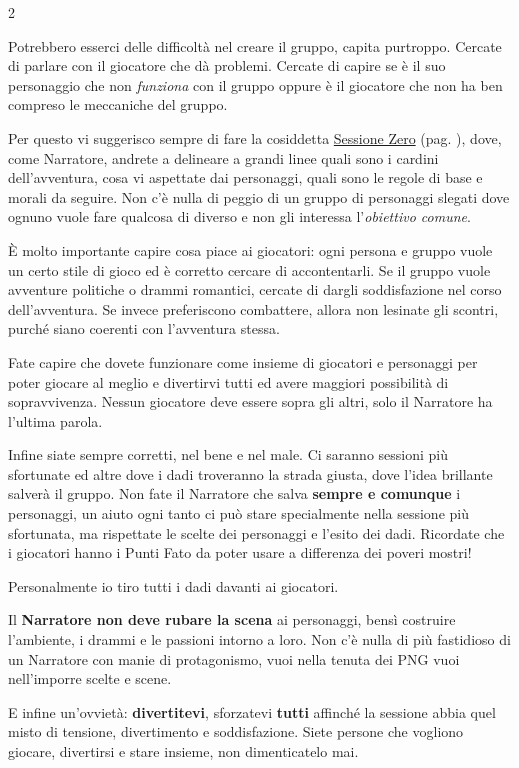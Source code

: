 \begin{multicols}{2}
{Potrebbero esserci delle difficoltà nel creare il gruppo, capita purtroppo. Cercate di parlare con il giocatore che dà problemi. Cercate di capire se è il suo personaggio che non \emph{funziona} con il gruppo oppure è il giocatore che non ha ben compreso le meccaniche del gruppo.

Per questo vi suggerisco sempre di fare la cosiddetta \hyperlink{sessionezero}{Sessione Zero} (pag. \pageref{sessionezero}), dove, come Narratore, andrete a delineare a grandi linee quali sono i cardini dell'avventura, cosa vi aspettate dai personaggi, quali sono le regole di base e morali da seguire. Non c'è nulla di peggio di un gruppo di personaggi slegati dove ognuno vuole fare qualcosa di diverso e non gli interessa l'\emph{obiettivo comune}.

È molto importante capire cosa piace ai giocatori: ogni persona e gruppo vuole un certo stile di gioco ed è corretto cercare di accontentarli. Se il gruppo vuole avventure politiche o drammi romantici, cercate di dargli soddisfazione nel corso dell'avventura. Se invece preferiscono combattere, allora non lesinate gli scontri, purché siano coerenti con l'avventura stessa.

Fate capire che dovete funzionare come insieme di giocatori e personaggi per poter giocare al meglio e divertirvi tutti ed avere maggiori possibilità di sopravvivenza. Nessun giocatore deve essere sopra gli altri, solo il Narratore ha l'ultima parola.

Infine siate sempre corretti, nel bene e nel male. Ci saranno sessioni più sfortunate ed altre dove i dadi troveranno la strada giusta, dove l'idea brillante salverà il gruppo. Non fate il Narratore che salva \textbf{sempre e comunque} i personaggi, un aiuto ogni tanto ci può stare specialmente nella sessione più sfortunata, ma rispettate le scelte dei personaggi e l'esito dei dadi. Ricordate che i giocatori hanno i Punti Fato da poter usare a differenza dei poveri mostri!

Personalmente io tiro tutti i dadi davanti ai giocatori.

Il \textbf{Narratore non deve rubare la scena} ai personaggi, bensì costruire l'ambiente, i drammi e le passioni intorno a loro. Non c'è nulla di più fastidioso di un Narratore con manie di protagonismo, vuoi nella tenuta dei PNG vuoi nell'imporre scelte e scene.

E infine un'ovvietà: \textbf{divertitevi}, sforzatevi \textbf{tutti} affinché la sessione abbia quel misto di tensione, divertimento e soddisfazione. Siete persone che vogliono giocare, divertirsi e stare insieme, non dimenticatelo mai.

} %

\end{multicols}


